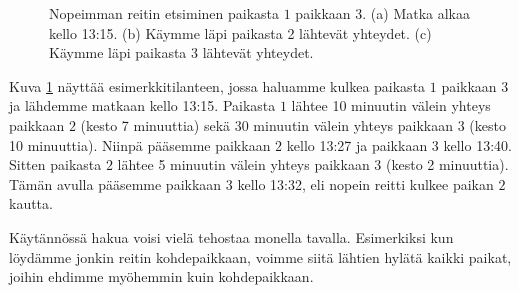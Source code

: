 \begin{figure}
\center
\begin{center}
\end{center}
\caption{Nopeimman reitin etsiminen paikasta $1$ paikkaan $3$.
(a) Matka alkaa kello 13:15. (b) Käymme läpi paikasta 2 lähtevät yhteydet.
(c) Käymme läpi paikasta 3 lähtevät yhteydet.}
\label{fig:reiopa}
\end{figure}

Kuva \ref{fig:reiopa} näyttää esimerkkitilanteen,
jossa haluamme kulkea paikasta $1$ paikkaan $3$ ja
lähdemme matkaan kello 13:15.
Paikasta $1$ lähtee 10 minuutin välein
yhteys paikkaan $2$ (kesto 7 minuuttia)
sekä 30 minuutin välein yhteys paikkaan $3$ (kesto 10 minuuttia).
Niinpä pääsemme paikkaan $2$ kello 13:27 ja paikkaan 3 kello 13:40.
Sitten paikasta $2$ lähtee 5 minuutin välein yhteys paikkaan $3$
(kesto 2 minuuttia).
Tämän avulla pääsemme paikkaan $3$ kello 13:32,
eli nopein reitti kulkee paikan $2$ kautta.

Käytännössä hakua voisi vielä tehostaa monella tavalla.
Esimerkiksi kun löydämme jonkin reitin kohdepaikkaan,
voimme siitä lähtien hylätä kaikki paikat,
joihin ehdimme myöhemmin kuin kohdepaikkaan.

